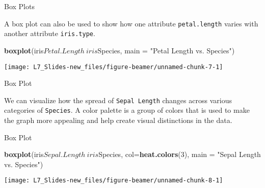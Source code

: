 \documentclass[ignorenonframetext,]{beamer}
\newenvironment{Shaded}{\begin{snugshade}}{\end{snugshade}}
\newcommand{\KeywordTok}[1]{\textcolor[rgb]{0.13,0.29,0.53}{\textbf{{#1}}}}
\newcommand{\DataTypeTok}[1]{\textcolor[rgb]{0.13,0.29,0.53}{{#1}}}
\newcommand{\DecValTok}[1]{\textcolor[rgb]{0.00,0.00,0.81}{{#1}}}
\newcommand{\StringTok}[1]{\textcolor[rgb]{0.31,0.60,0.02}{{#1}}}
\newcommand{\NormalTok}[1]{{#1}}
\begin{document}
\begin{frame}[fragile]{Box Plots}

A box plot can also be used to show how one attribute
\texttt{petal.length} varies with another attribute \texttt{iris.type}.

\small

\begin{Shaded}
\begin{Highlighting}[]
\KeywordTok{boxplot}\NormalTok{(iris$Petal.Length~iris$Species, }
        \DataTypeTok{main =} \StringTok{"Petal Length vs. Species"}\NormalTok{) }
\end{Highlighting}
\end{Shaded}

\begin{center}\texttt{[image: L7\_Slides-new\_files/figure-beamer/unnamed-chunk-7-1]} \end{center}

\end{frame}

\begin{frame}[fragile]{Box Plot}

We can visualize how the spread of \texttt{Sepal\ Length} changes across
various categories of \texttt{Species}. A color palette is a group of
colors that is used to make the graph more appealing and help create
visual distinctions in the data.

\end{frame}

\begin{frame}[fragile]{Box Plot}

\small

\begin{Shaded}
\begin{Highlighting}[]
\KeywordTok{boxplot}\NormalTok{(iris$Sepal.Length~iris$Species,}
        \DataTypeTok{col=}\KeywordTok{heat.colors}\NormalTok{(}\DecValTok{3}\NormalTok{), }
        \DataTypeTok{main =} \StringTok{"Sepal Length vs. Species"}\NormalTok{)}
\end{Highlighting}
\end{Shaded}

\begin{center}\texttt{[image: L7\_Slides-new\_files/figure-beamer/unnamed-chunk-8-1]} \end{center}

\end{frame}
\end{document}
